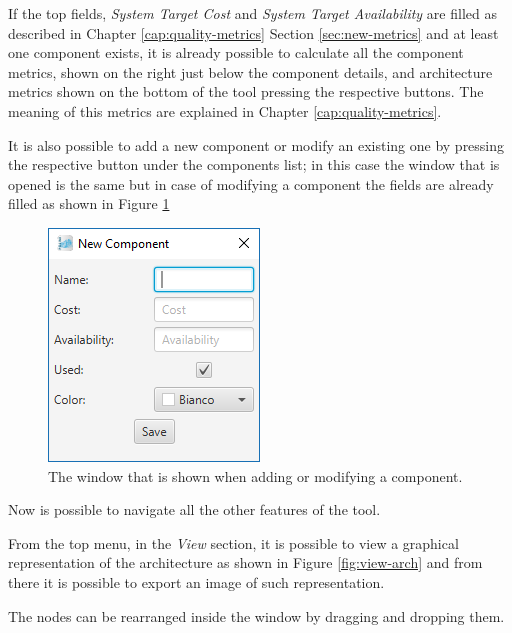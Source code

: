 If the top fields, \emph{System Target Cost} and \emph{System Target Availability} are filled as described in Chapter \ref{cap:quality-metrics} Section \ref{sec:new-metrics} and at least one component exists, it is already possible to calculate all the component metrics, shown on the right just below the component details, and architecture metrics shown on the bottom of the tool pressing the respective buttons. The meaning of this metrics are explained in Chapter \ref{cap:quality-metrics}.

It is also possible to add a new component or modify an existing one by pressing the respective button under the components list; in this case the window that is opened is the same but in case of modifying a component the fields are already filled as shown in Figure \ref{fig:add-modif-comp}

\begin{figure}[!ht]
	\centerline
	{\includegraphics[scale=0.6]{img/add_modif_comp.png}}
	\caption[Add/Modify Component]{The window that is shown when adding or modifying a component.}
	\label{fig:add-modif-comp}
\end{figure}

Now is possible to navigate all the other features of the tool.
 
From the top menu, in the \emph{View} section, it is possible to view a graphical representation of the architecture as shown in Figure \ref{fig:view-arch} and from there it is possible to export an image of such representation. 

The nodes can be rearranged inside the window by dragging and dropping them.

